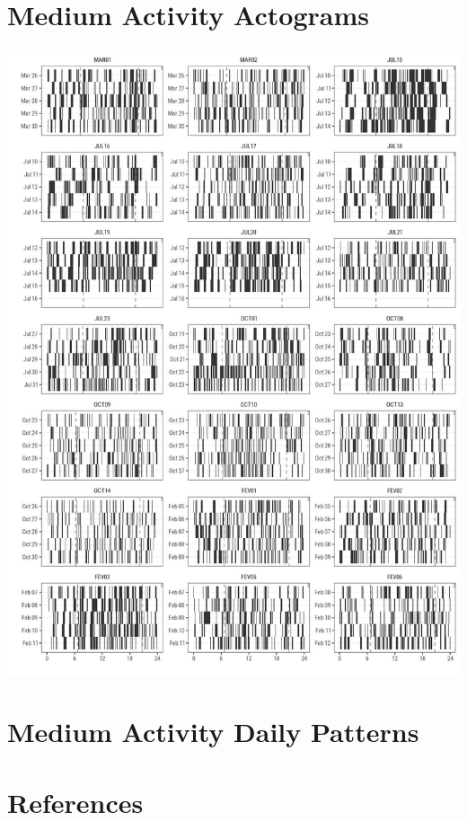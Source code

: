 \documentclass[english,msc,numbers,hidelinks]{coppe}
\begin{document}
  \hypertarget{medium-activity-actograms}{%
  \chapter{Medium Activity Actograms}\label{medium-activity-actograms}}
  \begin{center}\includegraphics[width=0.95\linewidth]{../04_figures/actograms/actograms_medium} \end{center}

  \hypertarget{medium-activity-daily-patterns}{%
  \chapter{Medium Activity Daily Patterns}\label{medium-activity-daily-patterns}}

  \backmatter
  
  

  \hypertarget{references}{%
  \chapter*{References}\label{references}}
\end{document}

